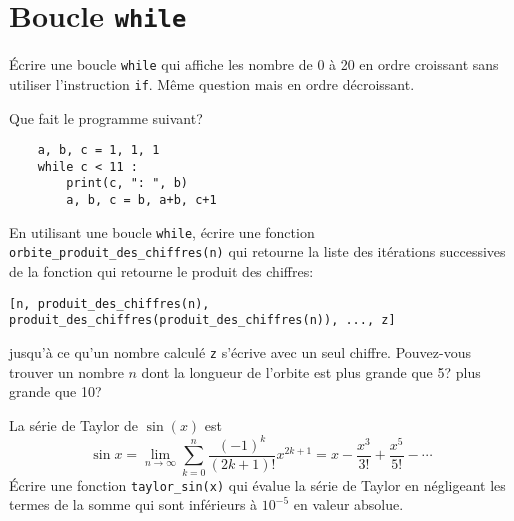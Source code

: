 \section{Boucle \texttt{while}}

\begin{question}
Écrire une boucle \texttt{while} qui affiche les nombre de 0 à 20 en ordre
croissant sans utiliser l'instruction \texttt{if}. Même question mais en ordre
décroissant.
\end{question}

\begin{question}
Que fait le programme suivant?
\begin{verbatim}
    a, b, c = 1, 1, 1
    while c < 11 :
        print(c, ": ", b)
        a, b, c = b, a+b, c+1
\end{verbatim}
\end{question}

\begin{question}
En utilisant une boucle \texttt{while},
écrire une fonction \texttt{orbite\_produit\_des\_chiffres(n)} qui retourne
la liste des itérations successives de la fonction qui retourne le produit des
chiffres:
{\small
\begin{verbatim}
[n, produit_des_chiffres(n), produit_des_chiffres(produit_des_chiffres(n)), ..., z]
\end{verbatim}}
\noindent
jusqu'à ce qu'un nombre calculé \texttt{z} s'écrive avec un seul chiffre.
Pouvez-vous trouver un nombre $n$ dont la longueur de l'orbite est plus grande
que 5? plus grande que 10?
\end{question}

\begin{question}
La série de Taylor de $\sin(x)$ est
\[
    \sin x= \lim_{n\to\infty}\sum^{n}_{k=0} \frac{(-1)^k}{(2k+1)!} x^{2k+1} = x -
\frac{x^3}{3!} + \frac{x^5}{5!} - \cdots
\]
Écrire une fonction \texttt{taylor\_sin(x)} qui évalue la série de Taylor en
négligeant les termes de la somme qui sont inférieurs à $10^{-5}$ en valeur absolue.
\end{question}
